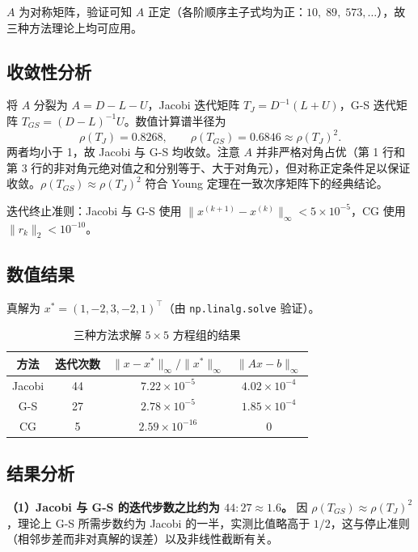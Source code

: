 \documentclass[10pt, a4paper]{article}
\begin{document}
$A$ 为对称矩阵，验证可知 $A$ 正定（各阶顺序主子式均为正：$10,\;89,\;573,\ldots$），故三种方法理论上均可应用。

\subsection{收敛性分析}

将 $A$ 分裂为 $A=D-L-U$，Jacobi 迭代矩阵 $T_J = D^{-1}(L+U)$，G-S 迭代矩阵 $T_{GS}=(D-L)^{-1}U$。数值计算谱半径为
\[
\rho(T_J) = 0.8268, \qquad \rho(T_{GS}) = 0.6846 \approx \rho(T_J)^2.
\]
两者均小于 1，故 Jacobi 与 G-S 均收敛。注意 $A$ 并非严格对角占优（第 1 行和第 3 行的非对角元绝对值之和分别等于、大于对角元），但对称正定条件足以保证收敛。$\rho(T_{GS})\approx\rho(T_J)^2$ 符合 Young 定理在一致次序矩阵下的经典结论。

迭代终止准则：Jacobi 与 G-S 使用 $\|x^{(k+1)}-x^{(k)}\|_\infty < 5\times10^{-5}$，CG 使用 $\|r_k\|_2<10^{-10}$。

\subsection{数值结果}

真解为 $x^*=(1,-2,3,-2,1)^\top$（由 \texttt{np.linalg.solve} 验证）。

\begin{table}[H]
    \centering
    \caption{三种方法求解 $5\times5$ 方程组的结果}
    \label{tab:iter}
    \begin{tabular}{cccc}
        \toprule
        方法 & 迭代次数 & $\|x-x^*\|_\infty/\|x^*\|_\infty$ & $\|Ax-b\|_\infty$ \\
        \midrule
        Jacobi  & 44 & $7.22\times10^{-5}$ & $4.02\times10^{-4}$ \\
        G-S     & 27 & $2.78\times10^{-5}$ & $1.85\times10^{-4}$ \\
        CG      &  5 & $2.59\times10^{-16}$ & $0$ \\
        \bottomrule
    \end{tabular}
\end{table}

\subsection{结果分析}

\textbf{（1）Jacobi 与 G-S 的迭代步数之比约为 $44:27\approx 1.6$。}
因 $\rho(T_{GS})\approx\rho(T_J)^2$，理论上 G-S 所需步数约为 Jacobi 的一半，实测比值略高于 $1/2$，这与停止准则（相邻步差而非对真解的误差）以及非线性截断有关。
\end{document}
